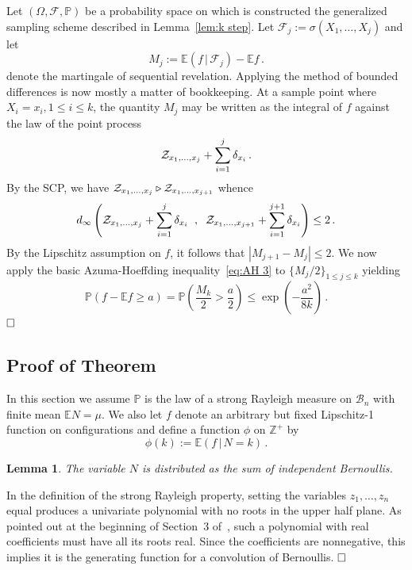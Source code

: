 \documentclass[10pt]{article}
\theoremstyle{plain}
\newtheorem{lem}[thm]{Lemma}
\theoremstyle{remark}
\def\Cox{\qed}
\def\Z{\mathbb{Z}}
\def\E{{\mathbb E}}
\def\P{{\mathbb P}}
\def\Cox{\hfill \Box}
\def\|{{\, | \, }}
\def\F{{\mathcal F}}
\def\B{{\mathcal B}}
\def\ZZ{{\cal Z}}
\def\mcovers{\triangleright}
\def\mean{\mu}
\begin{document}
Let $(\Omega , \F , \P)$ be a probability space on which is
constructed the generalized sampling scheme described in
Lemma~\ref{lem:k step}.  Let $\F_j := \sigma (X_1 , \ldots , X_j)$
and let
\begin{equation} \label{eq:mart}
M_j := \E (f \| \F_j) - \E f \, .
\end{equation}
denote the martingale of sequential revelation.  Applying
the method of bounded differences is now mostly a matter of
bookkeeping.  At a sample point where $X_i = x_i, 1 \leq i \leq k$,
the quantity $M_j$ may be written as the integral of $f$ against the
law of the point process
$$\ZZ_{x_1 , \ldots , x_j} + \sum_{i=1}^j \delta_{x_i} \, .$$
By the SCP, we have $\ZZ_{x_1 , \ldots , x_j} \mcovers
\ZZ_{x_1 , \ldots , x_{j+1}}$ whence
$$d_\infty \left ( \ZZ_{x_1 , \ldots , x_j} + \sum_{i=1}^j \delta_{x_i}
   \;\; , \;\; \ZZ_{x_1 , \ldots , x_{j+1}} + \sum_{i=1}^{j+1} \delta_{x_i}
   \right ) \leq 2 \, .$$
By the Lipschitz assumption on $f$, it follows that
$|M_{j+1} - M_j| \leq 2$.
We now apply the basic Azuma-Hoeffding inequality~\eqref{eq:AH 3}
to $\{ M_j / 2 \}_{1 \leq j \leq k}$ yielding
$$\P (f - \E f \geq a) = \P \left ( \frac{M_k}{2} > \frac{a}{2} \right )
   \leq \exp \left ( - \frac{a^2}{8 k} \right ) \, .$$
$\Cox$


\subsection{Proof of Theorem~\protect{\ref{th:general}}}

In this section we assume $\P$ is the law of a strong
Rayleigh measure on $\B_n$ with finite mean $\E N = \mean$.  
We also let $f$ denote
an arbitrary but fixed Lipschitz-1 function on configurations
and define a function $\phi$ on $\Z^+$ by
$$\phi (k) := \E (f \| N = k) \, .$$

\begin{lem} \label{lem:bernoulli}
The variable $N$ is distributed as the sum of independent Bernoullis.
\end{lem}

 In the definition of the strong Rayleigh
property, setting the variables $z_1 , \ldots , z_n$ equal
produces a univariate polynomial with no roots in the upper half
plane.  As pointed out at the beginning of Section~3
of~\cite{borcea-branden-liggett}, such a polynomial with
real coefficients must have all its roots real.  Since
the coefficients are nonnegative, this implies it is the
generating function for a convolution of Bernoullis.
$\Cox$
\end{document}
